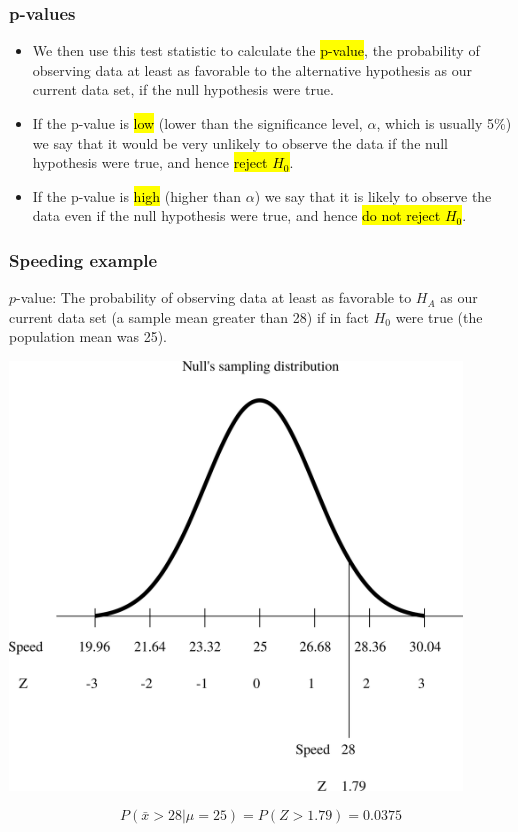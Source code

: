 
\begin{frame}
\frametitle{p-values}

\begin{itemize}

\item We then use this test statistic to calculate the \hl{p-value}, the probability of observing data at least as favorable to the alternative hypothesis as our current data set, if the null hypothesis were true.

\pause

\item If the p-value is \hl{low} (lower than the significance level, $\alpha$, which is usually 5\%) we say that it would be very unlikely to observe the data if the null hypothesis were true, and hence \hl{reject $H_0$}.

\pause

\item If the p-value is \hl{high} (higher than $\alpha$) we say that it is likely to observe the data even if the null hypothesis were true, and hence \hl{do not reject $H_0$}.

\end{itemize}

\end{frame}


\begin{frame}
\frametitle{Speeding example}
$p$-value: The probability of observing data at least as favorable to $H_A$ as our current data set (a sample mean greater than 28) if in fact $H_0$ were true (the population mean was 25).
\begin{center}
\includegraphics[width=0.9\textwidth]{4-3_hyp_test/figures/null.png}
\end{center} 
\pause

$$P(\bar{x} > 28 | \mu = 25) = P(Z > 1.79) = 0.0375 $$

\end{frame}

